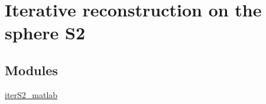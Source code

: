 \hypertarget{group__applications__iterS2}{
\section{Iterative reconstruction on the sphere S2}
\label{group__applications__iterS2}
}
\subsection*{Modules}
\begin{CompactItemize}
\item 
\hyperlink{group__applications__iterS2__matlab}{iter\-S2\_\-matlab}
\end{CompactItemize}
